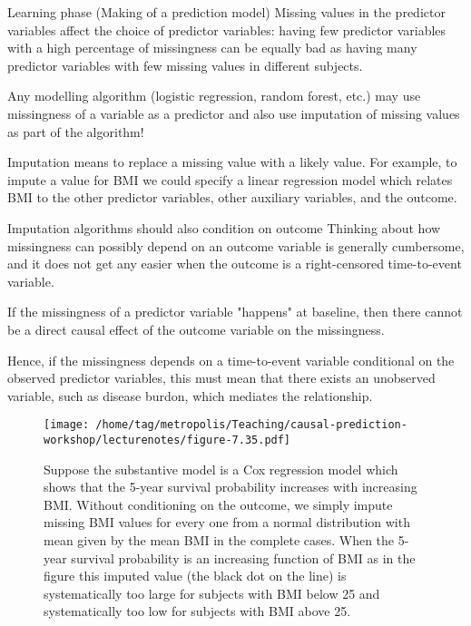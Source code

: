 \documentclass{beamer}\usepackage{listings}
\begin{document}
\begin{frame}[label={sec:org8e5d03e}]{Learning phase (Making of a prediction model)}
Missing values in the predictor variables affect the choice of
predictor variables: having few predictor variables with a high percentage of
missingness can be equally bad as having many predictor variables with few missing values in different subjects.
\vfill

Any modelling algorithm (logistic regression, random forest, etc.) may
use missingness of a variable as a predictor and also use imputation
of missing values as part of the algorithm!

\vfill

Imputation means to replace a missing value with a likely value.  For
example, to impute a value for BMI we could specify a linear
regression model which relates BMI to the other predictor variables,
other auxiliary variables, and the outcome.
\end{frame}
\begin{frame}[label={sec:orgf8d11ec}]{Imputation algorithms should also condition on outcome}
Thinking about how missingness can possibly depend on an outcome
variable is generally cumbersome, and it does not get any easier
when the outcome is a right-censored time-to-event variable.
\vfill

If the missingness of a predictor variable "happens" at baseline, then
there cannot be a direct causal effect of the outcome variable on the
missingness. 
\vfill

Hence, if the missingness depends on a time-to-event
variable conditional on the observed predictor variables, this must
mean that there exists an unobserved variable, such as disease burdon,
which mediates the relationship.
\end{frame}
\begin{frame}[label={sec:orgf423c20},shrink=25]{}
\begin{figure}[htbp]
\centering
\texttt{[image: /home/tag/metropolis/Teaching/causal-prediction-workshop/lecturenotes/figure-7.35.pdf]}
\caption{Suppose the substantive model is a Cox regression model which shows that the 5-year survival probability increases with increasing BMI. Without conditioning on the outcome, we simply impute missing BMI values for every one from a normal distribution with mean given by the mean BMI in the complete cases. When the 5-year survival probability is an increasing function of BMI as in the figure this imputed value (the black dot on the line) is systematically too large for subjects with BMI below 25 and systematically too low for subjects with BMI above 25.}
\end{figure}
\end{frame}
\end{document}
